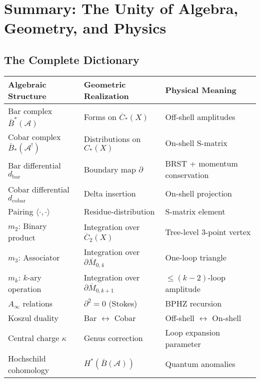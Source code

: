 
\section{Summary: The Unity of Algebra, Geometry, and Physics}
\label{sec:summary-feynman-unity}

\subsection{The Complete Dictionary}

\begin{center}
\begin{tabular}{|p{4cm}|p{5cm}|p{5cm}|}
\hline
\textbf{Algebraic Structure} & \textbf{Geometric Realization} & \textbf{Physical Meaning} \\
\hline
\hline
Bar complex $\bar{B}^*(\mathcal{A})$ & Forms on $\overline{C}_*(X)$ & Off-shell amplitudes \\
\hline
Cobar complex $\bar{B}_*(\mathcal{A}^!)$ & Distributions on $C_*(X)$ & On-shell S-matrix \\
\hline
Bar differential $d_{\text{bar}}$ & Boundary map $\partial$ & BRST + momentum conservation \\
\hline
Cobar differential $d_{\text{cobar}}$ & Delta insertion & On-shell projection \\
\hline
Pairing $\langle \cdot, \cdot \rangle$ & Residue-distribution & S-matrix element \\
\hline
\hline
$m_2$: Binary product & Integration over $\overline{C}_2(X)$ & Tree-level 3-point vertex \\
\hline
$m_3$: Associator & Integration over $\partial\overline{M}_{0,4}$ & One-loop triangle \\
\hline
$m_k$: $k$-ary operation & Integration over $\partial\overline{M}_{0,k+1}$ & $\leq(k-2)$-loop amplitude \\
\hline
\hline
$A_\infty$ relations & $\partial^2 = 0$ (Stokes) & BPHZ recursion \\
\hline
Koszul duality & Bar $\leftrightarrow$ Cobar & Off-shell $\leftrightarrow$ On-shell \\
\hline
Central charge $\kappa$ & Genus correction & Loop expansion parameter \\
\hline
Hochschild cohomology & $H^*(\bar{B}(\mathcal{A}))$ & Quantum anomalies \\
\hline
\end{tabular}
\end{center}

